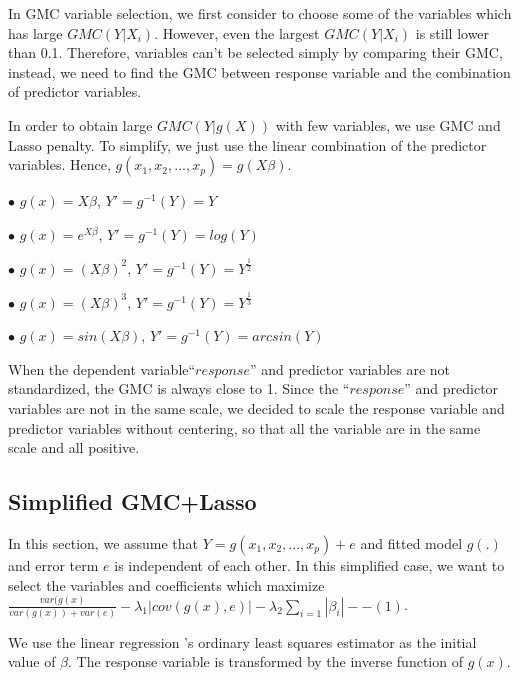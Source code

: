 \documentclass[conference,letterpaper]{IEEEtran}
\begin{document}
{\fontsize{11}{13}\selectfont 
In GMC variable selection, we first consider to choose some of the variables which has large $GMC(Y|X_i)$. However, even the largest $GMC(Y|X_i)$ is still lower than 0.1. Therefore, variables can't be selected simply by comparing their GMC, instead, we need to find the GMC between response variable and the combination of predictor variables.   

In order to obtain large $GMC(Y|g(X))$ with few variables, we use GMC and Lasso penalty. To simplify, we just use the linear combination of the predictor variables. Hence, $g(x_1,x_2,...,x_p)=g(X\beta)$. 
 
 

$\bullet$ {\fontsize{11}{13}\selectfont $g(x)=X\beta$, $Y'=g^{-1}(Y)=Y$ }

$\bullet$ {\fontsize{11}{13}\selectfont $g(x)=e^{X\beta}$, $Y'=g^{-1}(Y)=log(Y)$}

$\bullet$ {\fontsize{11}{13}\selectfont $g(x)=(X\beta)^2$, $Y'=g^{-1}(Y)=Y^{\frac{1}{2}}$}

$\bullet$ {\fontsize{11}{13}\selectfont $g(x)=(X\beta)^3$, $Y'=g^{-1}(Y)=Y^{\frac{1}{3}}$}

$\bullet$ {\fontsize{11}{13}\selectfont $g(x)=sin(X\beta)$, $Y'=g^{-1}(Y)=arcsin(Y)$}

When the dependent variable``$response$'' and predictor variables are not standardized, the GMC is always close to 1. Since the ``$response$'' and predictor variables are not in the same scale, we decided to scale the response variable and predictor variables without centering, so that all the variable are in the same scale and all positive.


\subsection{{\fontsize{11}{13}\selectfont Simplified GMC+Lasso}}
 In this section, we assume that $Y=g(x_1,x_2,...,x_p)+e$ and fitted model $g(.)$ and error term $e$ is independent of each other. In this simplified case, we want to select the variables and coefficients which maximize $\frac{var(g(x)}{var(g(x))+var(e)}-\lambda_1|cov(g(x),e)|-\lambda_2\sum_{i=1}{|\beta_i|} --(1)$.
 
 We use the linear regression 's ordinary least squares estimator as the initial value of $\beta$. The response variable is transformed by the inverse function of $g(x)$.
  
}
\end{document}
